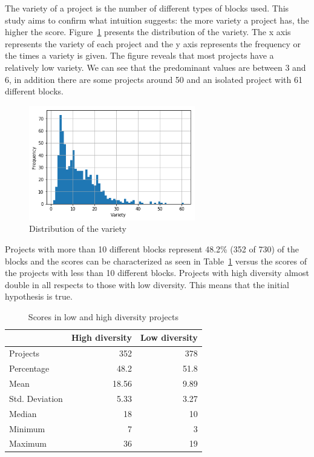 \documentclass[a4paper]{article}
\begin{document}
The variety of a project is the number of different types of blocks used. This study aims to confirm what intuition suggests: the more variety a project has, the higher the score. 
Figure~\ref{fig:var-dist} presents the distribution of the variety. The x axis represents the variety of each project and the y axis represents the frequency or the times a variety is given. The figure reveals that most projects have a relatively low variety. We can see that the predominant values are between 3 and 6, in addition there are some projects around 50 and an isolated project with 61 different blocks. 

\begin{figure}
\begin{center}
\includegraphics[height=5cm]{fig1}
\caption{Distribution of the variety}
\label{fig:var-dist}
\end{center}
\end{figure}

Projects with more than 10 different blocks represent 48.2\% (352 of 730) of the blocks and the scores can be characterized as seen in Table~\ref{tab:comparison} versus the scores of the projects with less than 10 different blocks. Projects with high diversity almost double in all respects to those with low diversity. This means that the initial hypothesis is true.

\begin{table}
\begin{center}
\caption{Scores in low and high diversity projects}
\bigskip
\label{tab:comparison}
\begin{tabular}{|l|r|r|}
\hline
& High diversity & Low diversity \\ \hline
Projects & 352 & 378\\ \hline
Percentage & 48.2 & 51.8\\ \hline
Mean & 18.56 & 9.89\\ \hline
Std. Deviation & 5.33 & 3.27\\ \hline
Median & 18 & 10\\ \hline
Minimum & 7 & 3\\ \hline
Maximum & 36 & 19\\ \hline
\end{tabular}
\end{center}
\end{table}
\end{document}
